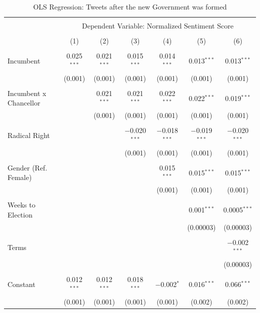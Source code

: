 \documentclass[a4paper,11pt]{article}
\begin{document}
\begin{table}[H]
    \centering
    \caption{OLS Regression: Tweets after the new Government was formed}
    \label{tab:regnewgvt}
\begingroup 
\scriptsize 
\begin{tabular}{@{\extracolsep{5pt}}lcccccc} 
\\[-1.8ex]\hline 
\hline \\[-1.8ex] 
 & \multicolumn{6}{c}{Dependent Variable: Normalized Sentiment Score} \\ 
\cline{2-7} 
\\[-1.8ex] & (1) & (2) & (3) & (4) & (5) & (6)\\ 
\hline \\[-1.8ex] 
 Incumbent & 0.025$^{***}$ & 0.021$^{***}$ & 0.015$^{***}$ & 0.014$^{***}$ & 0.013$^{***}$ & 0.013$^{***}$ \\ 
  & (0.001) & (0.001) & (0.001) & (0.001) & (0.001) & (0.001) \\ 
  & & & & & & \\ 
 Incumbent x Chancellor &  & 0.021$^{***}$ & 0.021$^{***}$ & 0.022$^{***}$ & 0.022$^{***}$ & 0.019$^{***}$ \\ 
  &  & (0.001) & (0.001) & (0.001) & (0.001) & (0.001) \\ 
  & & & & & & \\ 
 Radical Right &  &  & $-$0.020$^{***}$ & $-$0.018$^{***}$ & $-$0.019$^{***}$ & $-$0.020$^{***}$ \\ 
  &  &  & (0.001) & (0.001) & (0.001) & (0.001) \\ 
  & & & & & & \\ 
 Gender (Ref. Female) &  &  &  & 0.015$^{***}$ & 0.015$^{***}$ & 0.015$^{***}$ \\ 
  &  &  &  & (0.001) & (0.001) & (0.001) \\ 
  & & & & & & \\ 
 Weeks to Election &  &  &  &  & 0.001$^{***}$ & 0.0005$^{***}$ \\ 
  &  &  &  &  & (0.00003) & (0.00003) \\ 
  & & & & & & \\ 
 Terms &  &  &  &  &  & $-$0.002$^{***}$ \\ 
  &  &  &  &  &  & (0.00003) \\ 
  & & & & & & \\ 
 Constant & 0.012$^{***}$ & 0.012$^{***}$ & 0.018$^{***}$ & $-$0.002$^{*}$ & 0.016$^{***}$ & 0.066$^{***}$ \\ 
  & (0.001) & (0.001) & (0.001) & (0.001) & (0.002) & (0.002) \\ 

\end{tabular}
\end{table}
\end{document}
